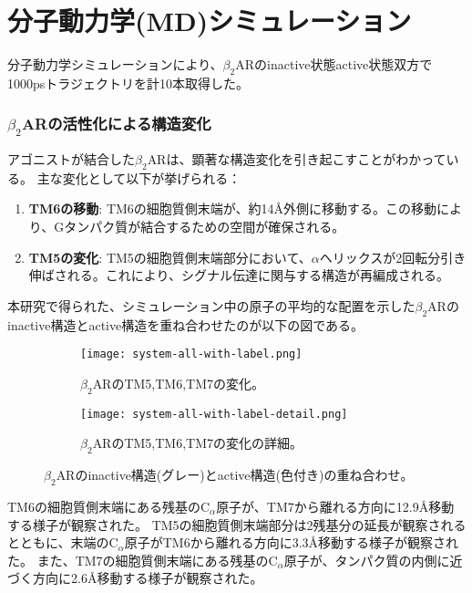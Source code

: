 \section{分子動力学(MD)シミュレーション}

分子動力学シミュレーションにより、$\beta_2$ARのinactive状態active状態双方で1000psトラジェクトリを計10本取得した。

\subsubsection{$\beta_2$ARの活性化による構造変化}
アゴニストが結合した$\beta_2$ARは、顕著な構造変化を引き起こす\cite{rasmussen2011crystal}ことがわかっている。
主な変化として以下が挙げられる：
\begin{enumerate}
    \item \textbf{TM6の移動}: TM6の細胞質側末端が、約14Å外側に移動する。この移動により、Gタンパク質が結合するための空間が確保される。
    \item \textbf{TM5の変化}: TM5の細胞質側末端部分において、$\alpha$ヘリックスが2回転分引き伸ばされる。これにより、シグナル伝達に関与する構造が再編成される。
\end{enumerate}

本研究で得られた、シミュレーション中の原子の平均的な配置を示した$\beta_2$ARのinactive構造とactive構造を重ね合わせたのが以下の図である。
\begin{figure}[htbp]
  \centering
  \begin{subfigure}{1.00\textwidth} %
    \centering
    \texttt{[image: system-all-with-label.png]}
    \caption{$\beta_2$ARのTM5,TM6,TM7の変化。}
    \label{fig:fitting_TM}
  \end{subfigure}
  \hspace{0.02\textwidth} %
  \begin{subfigure}{0.88\textwidth}
    \centering
    \texttt{[image: system-all-with-label-detail.png]}
    \caption{$\beta_2$ARのTM5,TM6,TM7の変化の詳細。}
    \label{fig:fitting_TM_detail}
  \end{subfigure}
  \caption{$\beta_2$ARのinactive構造(グレー)とactive構造(色付き)の重ね合わせ。}
  \label{fig:fitting-all}
\end{figure}

\newpage

TM6の細胞質側末端にある残基の$\mathrm{C}_\alpha$原子が、TM7から離れる方向に12.9Å移動する様子が観察された。
TM5の細胞質側末端部分は2残基分の延長が観察されるとともに、末端の$\mathrm{C}_\alpha$原子がTM6から離れる方向に3.3Å移動する様子が観察された。
また、TM7の細胞質側末端にある残基の$\mathrm{C}_\alpha$原子が、タンパク質の内側に近づく方向に2.6Å移動する様子が観察された。

